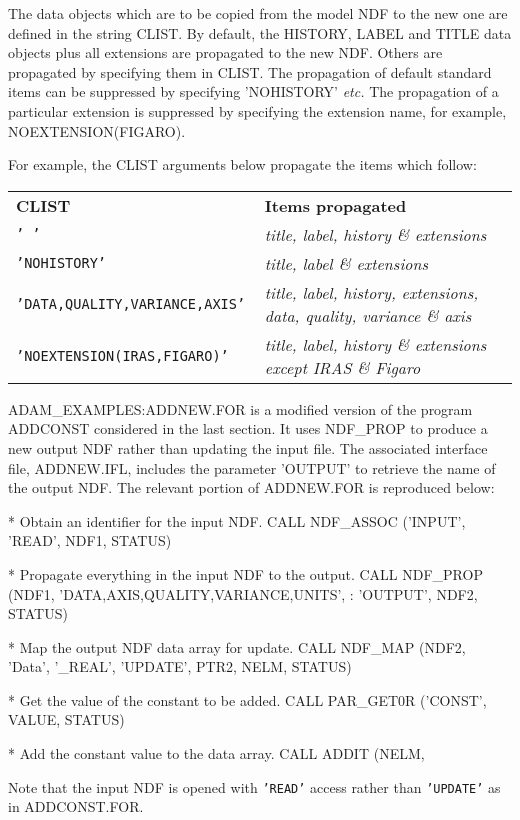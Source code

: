 \documentclass[twoside,11pt,nolof]{starlink}
\begin{document}
The data objects which are to be copied from the model NDF to the
new one are defined in the string CLIST.
By default, the HISTORY, LABEL and TITLE
data objects plus all extensions
are propagated to the new NDF.
Others are propagated by specifying them in CLIST.
The propagation of default standard items can be suppressed by
specifying 'NOHISTORY' \textit{etc.}
The propagation of a particular extension is suppressed by specifying the
extension name, for example, NOEXTENSION(FIGARO).

For example, the CLIST arguments below propagate the items which follow:

\begin{tabular}{ll}
{\bf{CLIST}                             }&\bf{Items propagated}\\
\texttt{' '                                }&{\sl title, label, history \& extensions}\\
\texttt{'NOHISTORY'                        }&{\sl title, label \& extensions}\\
\texttt{'DATA,QUALITY,VARIANCE,AXIS'       }&{\sl title, label, history, extensions, data, quality, variance \& axis}\\
\texttt{'NOEXTENSION(IRAS,FIGARO)'         }&{\sl title, label, history \& extensions except IRAS \& Figaro}\\
\end{tabular}

ADAM\_EXAMPLES:ADDNEW.FOR is
a modified version of the program ADDCONST considered in the last section.
It uses NDF\_PROP to produce a new output NDF rather than updating the input
file.
The associated interface file, ADDNEW.IFL, includes the
parameter 'OUTPUT' to retrieve the name of  the output NDF.
The relevant portion of ADDNEW.FOR is reproduced below:
\begin{terminalv}
*  Obtain an identifier for the input NDF.
      CALL NDF_ASSOC ('INPUT', 'READ', NDF1, STATUS)

*  Propagate everything in the input NDF to the output.
      CALL NDF_PROP (NDF1, 'DATA,AXIS,QUALITY,VARIANCE,UNITS',
     :               'OUTPUT', NDF2, STATUS)

*  Map the output NDF data array for update.
      CALL NDF_MAP (NDF2, 'Data', '_REAL', 'UPDATE', PTR2, NELM, STATUS)

*  Get the value of the constant to be added.
      CALL PAR_GET0R ('CONST', VALUE, STATUS)

*  Add the constant value to the data array.
      CALL ADDIT (NELM, %
\end{terminalv}
Note that the input NDF is opened with \texttt{'READ'} access rather than
\texttt{'UPDATE'} as in ADDCONST.FOR.
\end{document}
